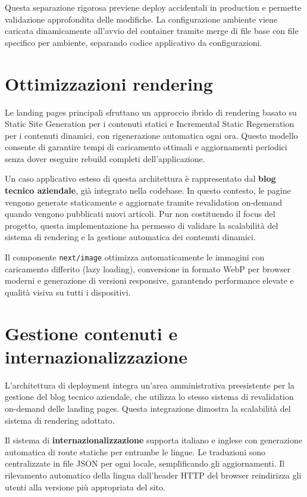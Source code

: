 Questa separazione rigorosa previene deploy accidentali in production e permette 
validazione approfondita delle modifiche. La configurazione ambiente viene caricata 
dinamicamente all'avvio del container tramite merge di file base con file specifico 
per ambiente, separando codice applicativo da configurazioni.

\section{Ottimizzazioni rendering}

Le landing pages principali sfruttano un approccio ibrido di rendering basato su 
Static Site Generation per i contenuti statici e Incremental Static Regeneration 
per i contenuti dinamici, con rigenerazione automatica ogni ora. Questo modello 
consente di garantire tempi di caricamento ottimali e aggiornamenti periodici 
senza dover eseguire rebuild completi dell'applicazione.

Un caso applicativo esteso di questa architettura è rappresentato dal 
\textbf{blog tecnico aziendale}, già integrato nella codebase. In questo contesto, 
le pagine vengono generate staticamente e aggiornate tramite revalidation on-demand 
quando vengono pubblicati nuovi articoli. Pur non costituendo il focus del progetto, 
questa implementazione ha permesso di validare la scalabilità del sistema di 
rendering e la gestione automatica dei contenuti dinamici.

Il componente \texttt{next/image} ottimizza automaticamente le immagini con 
caricamento differito (lazy loading), conversione in formato WebP per browser 
moderni e generazione di versioni responsive, garantendo performance elevate 
e qualità visiva su tutti i dispositivi.

\section{Gestione contenuti e internazionalizzazione}

L'architettura di deployment integra un'area amministrativa preesistente per 
la gestione del blog tecnico aziendale, che utilizza lo stesso sistema di 
revalidation on-demand delle landing pages. Questa integrazione dimostra la 
scalabilità del sistema di rendering adottato.

Il sistema di \textbf{internazionalizzazione} supporta italiano e inglese con 
generazione automatica di route statiche per entrambe le lingue. Le traduzioni 
sono centralizzate in file JSON per ogni locale, semplificando gli aggiornamenti. 
Il rilevamento automatico della lingua dall'header HTTP del browser reindirizza 
gli utenti alla versione più appropriata del sito.

